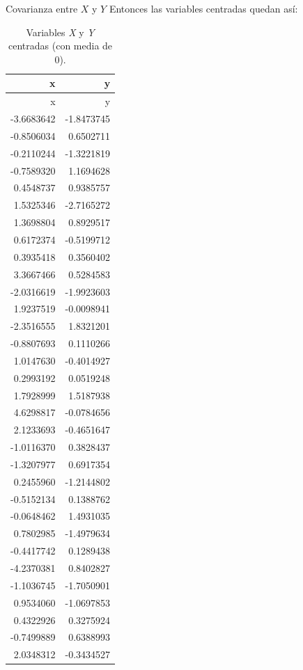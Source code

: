 \documentclass[
  11pt,
  ignorenonframetext,
]{beamer}
\begin{document}
\begin{frame}{Covarianza entre \(X\) y \(Y\)}
\protect\hypertarget{covarianza-entre-x-y-y-2}{}
Entonces las variables centradas quedan así:

\begin{longtable}[]{@{}rr@{}}
\caption{Variables \emph{X} y \emph{Y} centradas (con media de
0).}\tabularnewline
\toprule()
x & y \\
\midrule()
\endfirsthead
\toprule()
x & y \\
\midrule()
\endhead
-3.6683642 & -1.8473745 \\
-0.8506034 & 0.6502711 \\
-0.2110244 & -1.3221819 \\
-0.7589320 & 1.1694628 \\
0.4548737 & 0.9385757 \\
1.5325346 & -2.7165272 \\
1.3698804 & 0.8929517 \\
0.6172374 & -0.5199712 \\
0.3935418 & 0.3560402 \\
3.3667466 & 0.5284583 \\
-2.0316619 & -1.9923603 \\
1.9237519 & -0.0098941 \\
-2.3516555 & 1.8321201 \\
-0.8807693 & 0.1110266 \\
1.0147630 & -0.4014927 \\
0.2993192 & 0.0519248 \\
1.7928999 & 1.5187938 \\
4.6298817 & -0.0784656 \\
2.1233693 & -0.4651647 \\
-1.0116370 & 0.3828437 \\
-1.3207977 & 0.6917354 \\
0.2455960 & -1.2144802 \\
-0.5152134 & 0.1388762 \\
-0.0648462 & 1.4931035 \\
0.7802985 & -1.4979634 \\
-0.4417742 & 0.1289438 \\
-4.2370381 & 0.8402827 \\
-1.1036745 & -1.7050901 \\
0.9534060 & -1.0697853 \\
0.4322926 & 0.3275924 \\
-0.7499889 & 0.6388993 \\
2.0348312 & -0.3434527 \\

\end{longtable}
\end{frame}
\end{document}
